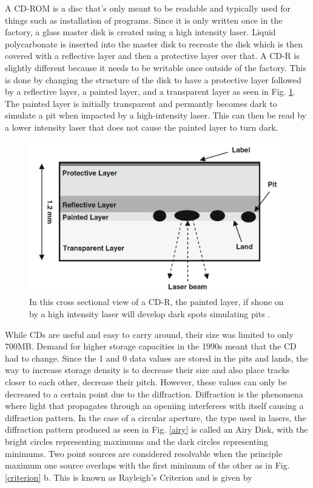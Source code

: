 \documentclass[ notitlepage, numerical, 11pt]{revtex4-1} %
\begin{document}
A CD-ROM is a disc that's only meant to be readable and typically used for things such as installation of programs. Since it is only written once in the factory, a glass master disk is created using a high intensity laser. Liquid polycarbonate is inserted into the master disk to recreate the disk which is then covered with a reflective layer and then a protective layer over that. 
A CD-R is slightly different because it needs to be writable once outside of the factory. This is done by changing the structure of the disk to have a protective layer followed by a reflective layer, a painted layer, and a transparent layer as seen in Fig. \ref{cdR}. The painted layer is initially transparent and permantly becomes dark to simulate a pit when impacted by a high-intensity laser. This can then be read by a lower intensity laser that does not cause the painted layer to turn dark.

\begin{figure}[H]
\centerline{\includegraphics[scale=.45]{cdR.png}}
\caption{In this cross sectional view of a CD-R, the painted layer, if shone on by a high intensity laser will develop dark spots simulating pits \cite{memory}.}
\label{cdR}
\end{figure} 

While CDs are useful and easy to carry around, their size was limited to only 700MB. Demand for higher storage capacities in the 1990s meant that the CD had to change. Since the 1 and 0 data values are stored in the pits and lands, the way to increase storage density is to decrease their size and also place tracks closer to each other, decrease their pitch. However, these values can only be decreased to a certain point due to the diffraction. Diffraction is the phenomena where light that propagates through an openiing interferees with itself causing a diffraction pattern. In the case of a circular aperture, the type used in lasers, the diffraction pattern produced as seen in Fig. \ref{airy} is called an Airy Disk, with the bright circles representing maximums and the dark circles representing minimums. Two point sources are considered resolvable when the principle maximum one source overlaps with the first minimum of the other as in Fig. \ref{criterion} b. This is known as Rayleigh's Criterion and is given by 
\end{document}

